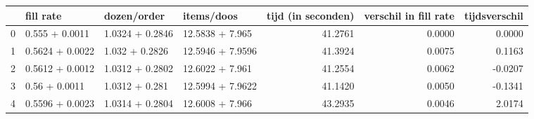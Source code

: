 \begin{tabular}{llllrrr}
\toprule
{} &        fill rate &      dozen/order &        items/doos &  tijd (in seconden) &  verschil in fill rate &  tijdsverschil \\
\midrule
0 &   0.555 + 0.0011 &  1.0324 + 0.2846 &   12.5838 + 7.965 &             41.2761 &                 0.0000 &         0.0000 \\
1 &  0.5624 + 0.0022 &   1.032 + 0.2826 &  12.5946 + 7.9596 &             41.3924 &                 0.0075 &         0.1163 \\
2 &  0.5612 + 0.0012 &  1.0312 + 0.2802 &   12.6022 + 7.961 &             41.2554 &                 0.0062 &        -0.0207 \\
3 &    0.56 + 0.0011 &   1.0312 + 0.281 &  12.5994 + 7.9622 &             41.1420 &                 0.0050 &        -0.1341 \\
4 &  0.5596 + 0.0023 &  1.0314 + 0.2804 &   12.6008 + 7.966 &             43.2935 &                 0.0046 &         2.0174 \\
\bottomrule
\end{tabular}
